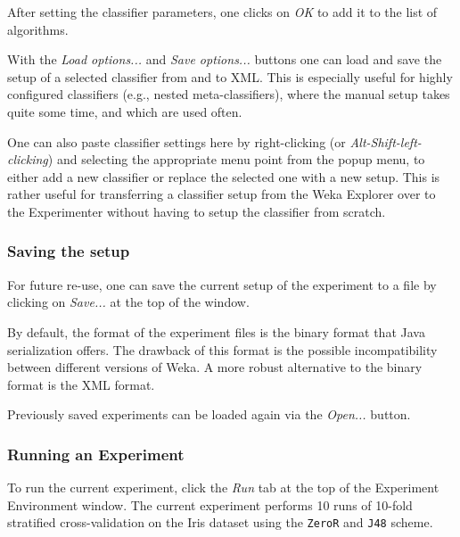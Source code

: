 After setting the classifier parameters, one clicks on \textit{OK} to add it to the list of algorithms.

\begin{center}
\end{center}


With the \textit{Load options...} and \textit{Save options...} buttons one can load and save the setup of a selected classifier from and to XML. This is especially useful for highly configured classifiers (e.g., nested meta-classifiers), where the manual setup takes quite some time, and which are used often.

One can also paste classifier settings here by right-clicking (or \textit{Alt-Shift-left-clicking}) and selecting the appropriate menu point from the popup menu, to either add a new classifier or replace the selected one with a new setup. This is rather useful for transferring a classifier setup from the Weka Explorer over to the Experimenter without having to setup the classifier from scratch.

\subsubsection{Saving the setup}

For future re-use, one can save the current setup of the experiment to a file by clicking on \textit{Save...} at the top of the window.

\begin{center}
\end{center}


By default, the format of the experiment files is the binary format that Java serialization offers. The drawback of this format is the possible incompatibility between different versions of Weka. A more robust alternative to the binary format is the XML format.

Previously saved experiments can be loaded again via the \textit{Open...} button.


\subsubsection{Running an Experiment}

To run the current experiment, click the \textit{Run} tab at the top of the Experiment Environment window. The current experiment performs 10 runs of 10-fold stratified cross-validation on the Iris dataset using the \texttt{ZeroR} and \texttt{J48} scheme.

